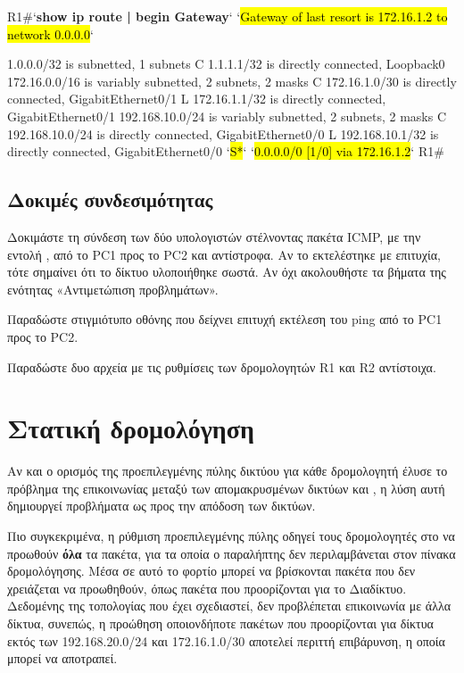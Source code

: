 \documentclass{EdipyLabs} %
\begin{document}
\begin{CommandBox}
R1#`\textbf{show ip route | begin Gateway}`
`\hl{Gateway of last resort is 172.16.1.2 to network 0.0.0.0}`

     1.0.0.0/32 is subnetted, 1 subnets
C       1.1.1.1/32 is directly connected, Loopback0
     172.16.0.0/16 is variably subnetted, 2 subnets, 2 masks
C       172.16.1.0/30 is directly connected, GigabitEthernet0/1
L       172.16.1.1/32 is directly connected, GigabitEthernet0/1
     192.168.10.0/24 is variably subnetted, 2 subnets, 2 masks
C       192.168.10.0/24 is directly connected, GigabitEthernet0/0
L       192.168.10.1/32 is directly connected, GigabitEthernet0/0
`\hl{S*}`   `\hl{0.0.0.0/0 [1/0] via 172.16.1.2}`
R1#
\end{CommandBox}

\subsection{Δοκιμές συνδεσιμότητας}
Δοκιμάστε τη σύνδεση των δύο υπολογιστών στέλνοντας πακέτα ICMP, με την εντολή , από το PC1 προς το PC2 και αντίστροφα. Αν το  εκτελέστηκε με επιτυχία, τότε σημαίνει ότι το δίκτυο υλοποιήθηκε σωστά. Αν όχι ακολουθήστε τα βήματα της ενότητας «Αντιμετώπιση προβλημάτων».

\begin{assignmentbox}
	Παραδώστε στιγμιότυπο οθόνης που δείχνει επιτυχή εκτέλεση του ping από το PC1 προς το PC2.
\end{assignmentbox}

\begin{assignmentbox}
	Παραδώστε δυο αρχεία με τις ρυθμίσεις των δρομολογητών R1 και R2 αντίστοιχα.
\end{assignmentbox}

\section{Στατική δρομολόγηση}
Αν και ο ορισμός της προεπιλεγμένης πύλης δικτύου για κάθε δρομολογητή έλυσε το πρόβλημα της επικοινωνίας μεταξύ των απομακρυσμένων δικτύων  και , η λύση αυτή δημιουργεί προβλήματα ως προς την απόδοση των δικτύων.

Πιο συγκεκριμένα, η ρύθμιση προεπιλεγμένης πύλης οδηγεί τους δρομολογητές στο να προωθούν \textbf{όλα} τα πακέτα, για τα οποία ο παραλήπτης δεν περιλαμβάνεται στον πίνακα δρομολόγησης. Μέσα σε αυτό το φορτίο μπορεί να βρίσκονται πακέτα που δεν χρειάζεται να προωθηθούν, όπως πακέτα που προορίζονται για το Διαδίκτυο. Δεδομένης της τοπολογίας που έχει σχεδιαστεί, δεν προβλέπεται επικοινωνία με άλλα δίκτυα, συνεπώς, η προώθηση οποιονδήποτε πακέτων που προορίζονται για δίκτυα εκτός των 192.168.20.0/24 και 172.16.1.0/30 αποτελεί περιττή επιβάρυνση, η οποία μπορεί να αποτραπεί.
\end{document}

